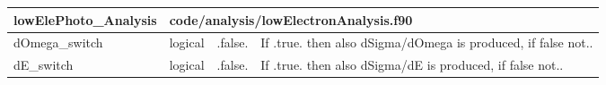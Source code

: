 \documentclass{article}
\begin{document}
\begin{longtable}{llll}
\toprule
\textbf{\large{lowElePhoto\_Analysis}} & \multicolumn{3}{l}{\footnotesize{code/analysis/lowElectronAnalysis.f90}}\\*
\midrule
\endfirsthead
\midrule
\endhead
dOmega\_switch & \begin{minipage}[t]{2cm}logical\end{minipage} & \begin{minipage}[t]{2cm}.false.\end{minipage} & \begin{minipage}[t]{12cm}If .true. then also dSigma/dOmega is produced, if false not..\end{minipage}\\*
\midrule
dE\_switch & \begin{minipage}[t]{2cm}logical\end{minipage} & \begin{minipage}[t]{2cm}.false.\end{minipage} & \begin{minipage}[t]{12cm}If .true. then also dSigma/dE is produced, if false not..\end{minipage}\\*
\bottomrule
\end{longtable}
{ }



\end{document}
